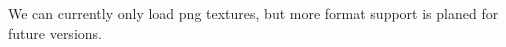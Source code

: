 
\begin{DoxyRefList}
\item[\label{todo__todo000001}%
\hypertarget{todo__todo000001}{}%
Class \hyperlink{class_texture}{Texture} ]We can currently only load png textures, but more format support is planed for future versions.
\end{DoxyRefList}